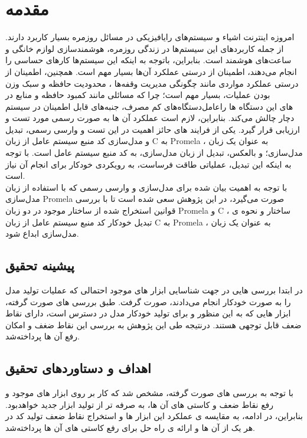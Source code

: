 \chapter{مقدمه}

اﻣﺮوزه اﯾﻨﺘﺮﻧﺖ اﺷﯿﺎء و ﺳﯿﺴﺘﻢ‌ﻫﺎی راﯾﺎﻓﯿﺰیکی   در مسائل روزمره بسیار کاربرد دارند. از جمله ﮐﺎرﺑﺮدﻫﺎی این ﺳﯿﺴﺘﻢ‌ها در زندگی روزﻣﺮه، ﻫﻮﺷﻤﻨﺪﺳﺎزی لوازم خانگی و ساعت‌های هوشمند است. بنابراین، ﺑﺎﺗﻮﺟﻪ ﺑﻪ اﯾﻨﮑﻪ این ﺳﯿﺴﺘﻢ‌ﻫﺎ کارﻫﺎی ﺣﺴﺎسی را اﻧﺠﺎم می‌دﻫﻨﺪ، اطمینان از درستی عملکرد آن‌ها بسیار مهم است. همچنین، اطمینان از درستی عملکرد مواردی مانند چگونگی ﻣﺪﯾﺮﯾﺖ وﻗﻔﻪ‌ﻫﺎ ، ﻣﺤﺪودﯾﺖ ﺣﺎﻓﻈﻪ و سبک وزن ﺑﻮدن ﻋﻤﻠﯿﺎت، بسیار مهم است؛ چرا که مسائلی مانند کمبود حافظه و ﻣﻨﺎﺑﻊ در دﺳﺘﮕﺎه‌های ﮐﻢ ﻣﺼﺮف، ﺟﻨﺒﻪ‌ﻫﺎی ﻗﺎبل اﻃﻤﯿﻨﺎن در ﺳﯿﺴﺘﻢ‎ﻋﺎﻣﻞ‎های این دﺳﺘﮕﺎه ها را دچار ﭼﺎﻟﺶ می‌کند. بنابراین، لازم است عملکرد آن ها به صورت رسمی مورد تست و ارزیابی قرار گیرد\cite{7}. یکی از فرایند های حائز اهمیت در این تست و وارسی رسمی، تبدیل و ﻣﺪل‌سازی ﮐﺪ ﻣﻨﺒﻊ ﺳﯿﺴﺘﻢ ﻋﺎﻣﻞ از زبان C ﺑﻪ Promela ، به عنوان یک زبان مدل‌سازی؛ و بالعکس، تبدیل از زبان مدل‌سازی، به کد منبع سیستم عامل است. با توجه به اینکه این تبدیل، عملیاتی طاقت فرساست، به رویکردی خودکار برای انجام آن نیاز است.
\\
با توجه به اهمیت بیان شده برای مدل‌سازی و وارسی رسمی که با استفاده از زبان مدل‌سازی Promela  صورت می‌گیرد، در این پژوهش سعی شده است تا با بررسی قوانین استخراج شده از ساختار موجود در دو زبان Promela و C ، ساختار و نحوه ی تبدیل خودکار کد ﻣﻨﺒﻊ ﺳﯿﺴﺘﻢ ﻋﺎﻣﻞ از زبان C ﺑﻪ Promela ، به عنوان یک زبان مدل‌سازی ابداع شود.


\section{پیشینه تحقیق}
 
در ابتدا بررسی هایی در جهت شناسایی ابزار های موجود احتمالی که عملیات تولید مدل را به صورت خودکار انجام می‌دادند، صورت گرفت. طبق بررسی های صورت گرفته، ابزار هایی که به این منظور و برای تولید خودکار مدل در دسترس است، دارای نقاط ضعف قابل توجهی هستند. درنتیجه طی این پژوهش به بررسی این نقاط ضغف و امکان رفع آن ها پرداخته‌شد.


\section{اهداف و دستاوردهای تحقیق}
با توجه به بررسی های صورت گرفته، مشخص شد که کار بر روی ابزار های موجود و رفع نقاط ضعف و کاستی های آن ها، به صرفه تر از تولید ابزار جدید خواهدبود. بنابراین، در ادامه، به مقایسه ی عملکرد این ابزار ها و استخراج نقاط ضعف تولید کد در هر یک از آن ها و ارائه ی راه حل برای رفع کاستی های آن ها پرداخته‌شد.



